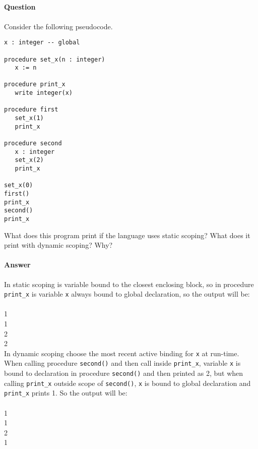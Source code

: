 \documentclass[5pt]{article}
\begin{document}
\subsection{}

\paragraph{Question}
Consider the following pseudocode.

\begin{verbatim}
x : integer -- global

procedure set_x(n : integer)
   x := n
   
procedure print_x
   write integer(x)
   
procedure first
   set_x(1)
   print_x
   
procedure second
   x : integer
   set_x(2)
   print_x

set_x(0)
first()
print_x
second()
print_x
\end{verbatim}
What does this program print if the language uses static scoping? What does
it print with dynamic scoping? Why?

\paragraph{Answer}
In static scoping is variable bound to the closest enclosing block, so in
procedure \verb|print_x| is variable \verb|x| always bound to global
declaration, so the output will be:\\
\\
1\\
1\\
2\\
2\\
In dynamic scoping choose the most recent active binding for \verb|x| at
run-time. When calling procedure \verb|second()| and then call inside
\verb|print_x|, variable \verb|x| is bound to
declaration in procedure \verb|second()| and then printed as 2, but when calling
\verb|print_x| outside scope of \verb|second()|, \verb|x| is bound to global
declaration and \verb|print_x| prints 1. So the output will be:\\
\\
1\\
1\\
2\\
1\\
\end{document}
